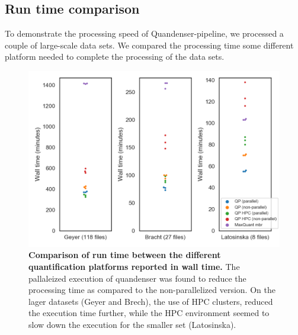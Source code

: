 \documentclass[11pt]{article}
\begin{document}

\subsection*{Run time comparison}
To demonstrate the processing speed of Quandenser-pipeline, we processed a couple of large-scale data sets. We compared the processing time some different platform needed to complete the processing of the data sets.

\begin{figure}[H]
  \includegraphics[width=\linewidth]{data/times.png}
  \caption{\textbf{Comparison of run time between the different quantification platforms reported in wall time.} The pallaleized execution of quandenser was found to reduce the processing time as compared to the non-parallelized version. On the lager datasets (Geyer and Brech), the use of HPC clusters, reduced the execution time further, while the HPC environment seemed to slow down the execution for the smaller set (Latosinska).}
  \label{fig:walltime}
\end{figure}
\end{document}
